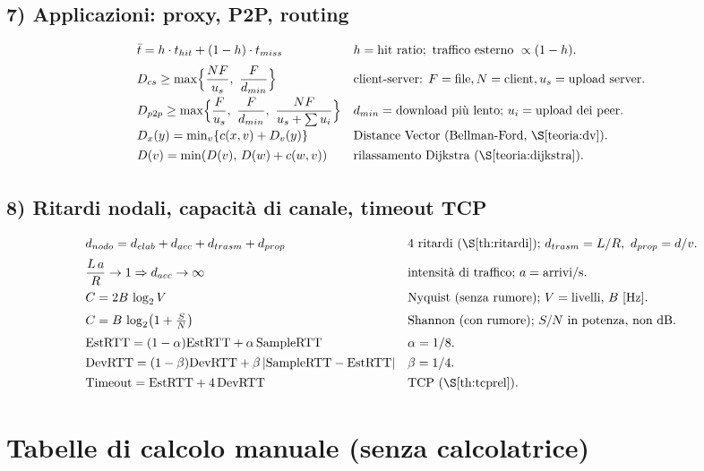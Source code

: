 \documentclass[11pt,a4paper]{report}
\begin{document}
\subsection*{7) Applicazioni: proxy, P2P, routing}
\[
\begin{array}{ll}
\bar t = h\cdot t_{hit}+(1-h)\cdot t_{miss} & h=\text{hit ratio}; \text{ traffico esterno } \propto (1-h).\\[6pt]
D_{cs}\ge \max\!\Big\{\dfrac{NF}{u_s},\ \dfrac{F}{d_{min}}\Big\} & \text{client-server: } F=\text{file}, N=\text{client}, u_s=\text{upload server}.\\[8pt]
D_{p2p}\ge \max\!\Big\{\dfrac{F}{u_s},\ \dfrac{F}{d_{min}},\ \dfrac{NF}{u_s+\sum u_i}\Big\} & d_{min}=\text{download più lento; } u_i=\text{upload dei peer}.\\[8pt]
D_x(y)=\min_{v}\{c(x,v)+D_v(y)\} & \text{Distance Vector (Bellman-Ford, }\S\ref{teoria:dv}\text{).}\\[4pt]
D(v)=\min(D(v),\,D(w)+c(w,v)) & \text{rilassamento Dijkstra (}\S\ref{teoria:dijkstra}\text{).}\\[2pt]
\end{array}
\]

\subsection*{8) Ritardi nodali, capacità di canale, timeout TCP}
\[
\begin{array}{ll}
d_{nodo}=d_{elab}+d_{acc}+d_{trasm}+d_{prop} & \text{4 ritardi (}\S\ref{th:ritardi}\text{); } d_{trasm}=L/R,\ d_{prop}=d/v.\\[6pt]
\dfrac{L\,a}{R}\to 1 \Rightarrow d_{acc}\to\infty & \text{intensità di traffico; }a=\text{arrivi/s.}\\[8pt]
C = 2B\,\log_2 V & \text{Nyquist (senza rumore); }V=\text{livelli, }B\text{ [Hz].}\\[6pt]
C = B\,\log_2\!\big(1+\tfrac{S}{N}\big) & \text{Shannon (con rumore); }S/N \text{ in potenza, non dB.}\\[6pt]
\text{EstRTT}=(1-\alpha)\text{EstRTT}+\alpha\,\text{SampleRTT} & \alpha=1/8.\\[4pt]
\text{DevRTT}=(1-\beta)\text{DevRTT}+\beta\,|\text{SampleRTT}-\text{EstRTT}| & \beta=1/4.\\[4pt]
\text{Timeout}=\text{EstRTT}+4\,\text{DevRTT} & \text{TCP (}\S\ref{th:tcprel}\text{).}\\[2pt]
\end{array}
\]

\section{Tabelle di calcolo manuale (senza calcolatrice)}
\label{teoria:tabelle}
\end{document}
